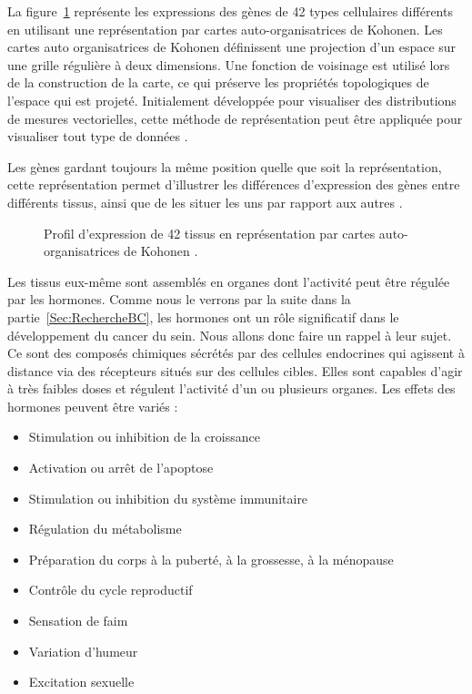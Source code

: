 			La figure~\ref{fig:Wirth2011} représente les expressions des gènes de 42 types cellulaires différents en utilisant une représentation par cartes auto-organisatrices de Kohonen.
			Les cartes auto organisatrices de Kohonen définissent une projection d'un espace sur une grille régulière à deux dimensions. Une fonction de voisinage est utilisé lors de la construction de la carte, ce qui préserve les propriétés topologiques de l'espace qui est projeté. Initialement développée pour visualiser des distributions de mesures vectorielles, cette méthode de représentation peut être appliquée pour visualiser tout type de données \citep{Kohonen1982,Kohonen2007}.

			Les gènes gardant toujours la même position quelle que soit la représentation, cette représentation permet d'illustrer les différences d'expression des gènes entre différents tissus, ainsi que de les situer les uns par rapport aux autres \citep{Wirth2011}.

			\begin{figure}
				\begin{center}
					\def\svgwidth{\columnwidth}
					\caption{Profil d'expression de 42 tissus en représentation par cartes auto-organisatrices de Kohonen \citep{Wirth2011}.}
					\label{fig:Wirth2011}
				\end{center}
			\end{figure}


			Les tissus eux-même sont assemblés en organes dont l'activité peut être régulée par les hormones.
			Comme nous le verrons par la suite dans la partie~\ref{Sec:RechercheBC}, les hormones ont un rôle significatif dans le développement du cancer du sein.
			Nous allons donc faire un rappel à leur sujet.
			Ce sont des composés chimiques sécrétés par des cellules endocrines qui agissent à distance via des récepteurs situés sur des cellules cibles.
			Elles sont capables d'agir à très faibles doses et régulent l'activité d'un ou plusieurs organes.
			Les effets des hormones peuvent être variés :
			\begin{itemize}
					\item   Stimulation ou inhibition de la croissance
					\item   Activation ou arrêt de l'apoptose
					\item   Stimulation ou inhibition du système immunitaire
					\item   Régulation du métabolisme
					\item   Préparation du corps à la puberté, à la grossesse, à la ménopause
					\item   Contrôle du cycle reproductif
					\item   Sensation de faim
					\item   Variation d'humeur
					\item   Excitation sexuelle
			\end{itemize}
			\vspace{1.5ex}

